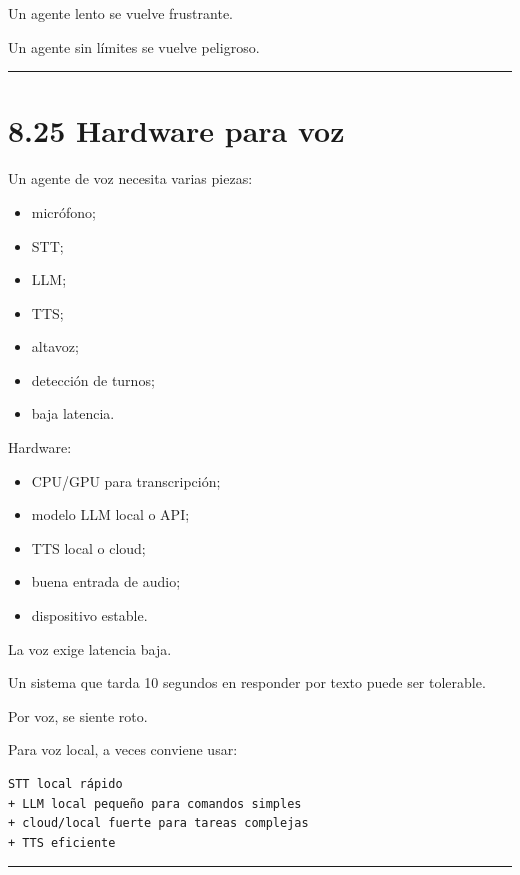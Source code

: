 Un agente lento se vuelve frustrante.

Un agente sin límites se vuelve peligroso.

\begin{center}\rule{0.5\linewidth}{0.5pt}\end{center}

\section{8.25 Hardware para voz}\label{hardware-para-voz}

Un agente de voz necesita varias piezas:

\begin{itemize}
\tightlist
\item
  micrófono;
\item
  STT;
\item
  LLM;
\item
  TTS;
\item
  altavoz;
\item
  detección de turnos;
\item
  baja latencia.
\end{itemize}

Hardware:

\begin{itemize}
\tightlist
\item
  CPU/GPU para transcripción;
\item
  modelo LLM local o API;
\item
  TTS local o cloud;
\item
  buena entrada de audio;
\item
  dispositivo estable.
\end{itemize}

La voz exige latencia baja.

Un sistema que tarda 10 segundos en responder por texto puede ser
tolerable.

Por voz, se siente roto.

Para voz local, a veces conviene usar:

\begin{lstlisting}
STT local rápido
+ LLM local pequeño para comandos simples
+ cloud/local fuerte para tareas complejas
+ TTS eficiente
\end{lstlisting}

\begin{center}\rule{0.5\linewidth}{0.5pt}\end{center}

